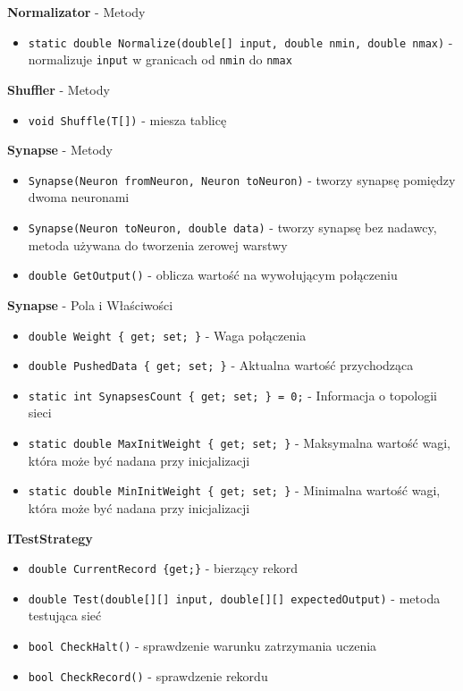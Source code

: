 \documentclass[12pt,a4paper]{article}
\begin{document}
    \textbf{Normalizator} - Metody
    \begin{itemize}
        \item \lstinline{static double Normalize(double[] input, double nmin, double nmax)} - normalizuje \lstinline{input} w granicach od \lstinline{nmin} do \lstinline{nmax}
    \end{itemize}
    
    \textbf{Shuffler} - Metody
    \begin{itemize}
        \item \lstinline{void Shuffle(T[])} - miesza tablicę
    \end{itemize}
    
    \textbf{Synapse} - Metody
    \begin{itemize}
        \item \lstinline{Synapse(Neuron fromNeuron, Neuron toNeuron)} - tworzy synapsę pomiędzy dwoma neuronami
        \item \lstinline{Synapse(Neuron toNeuron, double data)} - tworzy synapsę bez nadawcy, metoda używana do tworzenia zerowej warstwy
        \item \lstinline{double GetOutput()} - oblicza wartość na wywołującym połączeniu
    \end{itemize}
    
    \textbf{Synapse} - Pola i Właściwości
    \begin{itemize}
        \item \lstinline|double Weight { get; set; }| - Waga połączenia
        \item \lstinline|double PushedData { get; set; }| - Aktualna wartość przychodząca
        \item \lstinline|static int SynapsesCount { get; set; } = 0;| - Informacja o topologii sieci
        \item \lstinline|static double MaxInitWeight { get; set; }| - Maksymalna wartość wagi, która może być nadana przy inicjalizacji
        \item \lstinline|static double MinInitWeight { get; set; }| - Minimalna wartość wagi, która może być nadana przy inicjalizacji
    \end{itemize}
    
    
    \textbf{ITestStrategy}
    \begin{itemize}
        \item \lstinline|double CurrentRecord {get;}| - bierzący rekord
        \item \lstinline|double Test(double[][] input, double[][] expectedOutput)| - metoda testująca sieć
        \item \lstinline|bool CheckHalt()| - sprawdzenie warunku zatrzymania uczenia
        \item \lstinline|bool CheckRecord()| - sprawdzenie rekordu
    \end{itemize}
    
\end{document}
